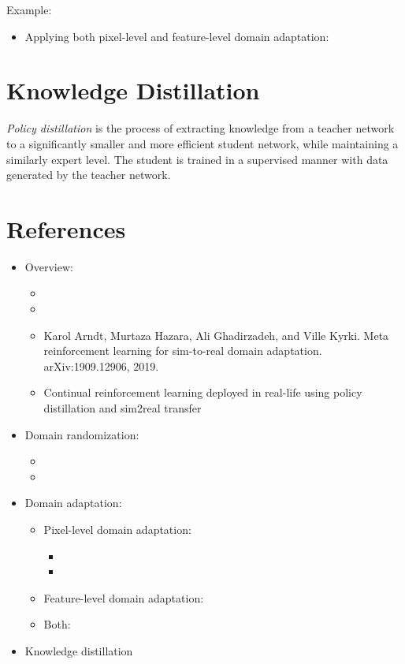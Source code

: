 Example:
\begin{itemize}
	\item Applying both pixel-level and feature-level domain adaptation: 
\end{itemize}

\section{Knowledge Distillation}
\textit{Policy distillation} is the process of extracting knowledge from a teacher network to a significantly smaller and more efficient student network, while maintaining a similarly expert level. The student is trained in a supervised manner with data generated by the teacher network.


\section{References}
\begin{itemize}
	\item Overview:
	\begin{itemize}
		\item {}
		\item {}
		\item Karol Arndt, Murtaza Hazara, Ali Ghadirzadeh, and Ville Kyrki. Meta reinforcement learning for sim-to-real domain adaptation. arXiv:1909.12906, 2019.
		\item Continual reinforcement learning deployed in real-life using policy distillation and sim2real transfer
	\end{itemize}
	\item Domain randomization:
	\begin{itemize}
		\item {}
		\item {}
	\end{itemize}
	\item Domain adaptation:
	\begin{itemize}
		\item Pixel-level domain adaptation:
		\begin{itemize}
			\item {}
			\item {}
		\end{itemize}
		\item Feature-level domain adaptation: 
		\item Both: 
	\end{itemize}
	\item Knowledge distillation
\end{itemize}
